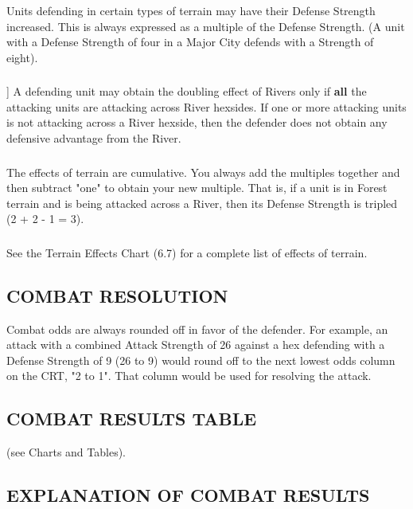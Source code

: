 \subsubsection{} Units defending in certain types of terrain may have their Defense Strength increased. This is always expressed as a multiple of the Defense Strength. (A unit with a Defense Strength of four in a Major City defends with a Strength of eight).

\subsubsection{}] A defending unit may obtain the doubling effect of Rivers only if \textbf{all} the attacking units are attacking across River hexsides. If one or more attacking units is not attacking across a River hexside, then the defender does not obtain any defensive advantage from the River.

\subsubsection{} The effects of terrain are cumulative. You always add the multiples together and then subtract "one" to obtain your new multiple. That is, if a unit is in Forest terrain and is being attacked across a River, then its Defense Strength is tripled (2 + 2 - 1 = 3).

\subsubsection{} See the Terrain Effects Chart (6.7) for a complete list of effects of terrain.

\subsection{COMBAT RESOLUTION}

Combat odds are always rounded off in favor of the defender. For example, an attack with a combined Attack Strength of 26 against a hex defending with a Defense Strength of 9 (26 to 9) would round off to the next lowest odds column on the CRT, "2 to 1". That column would be used for resolving the attack.

\subsection{COMBAT RESULTS TABLE} (see Charts and Tables).

\begin{flushleft}
  \subsection{EXPLANATION OF COMBAT RESULTS}
\end{flushleft}

